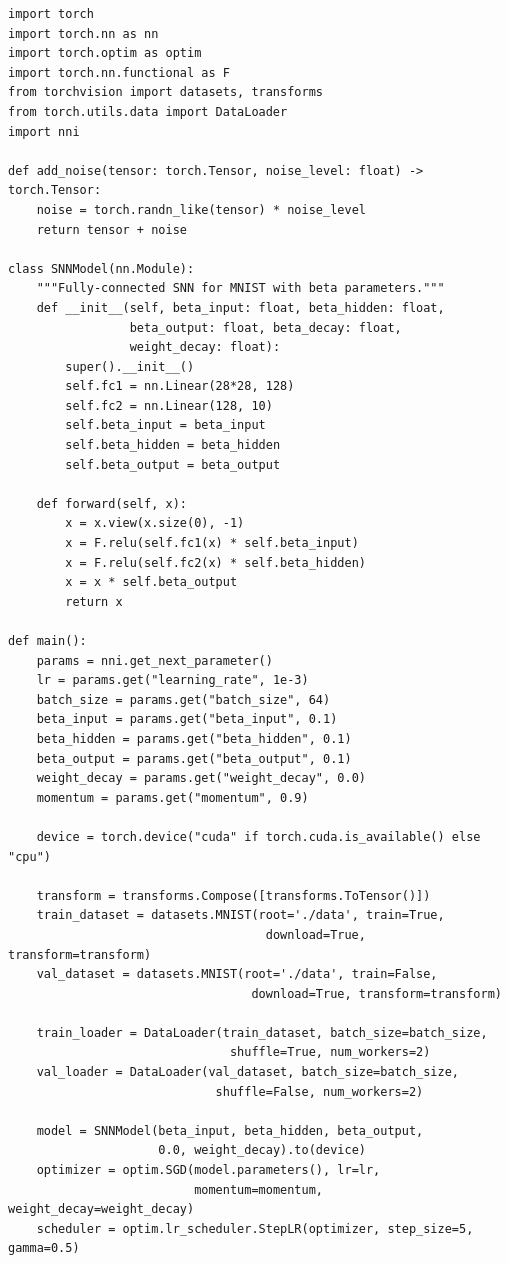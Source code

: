 \begin{lstlisting}
import torch
import torch.nn as nn
import torch.optim as optim
import torch.nn.functional as F
from torchvision import datasets, transforms
from torch.utils.data import DataLoader
import nni

def add_noise(tensor: torch.Tensor, noise_level: float) -> torch.Tensor:
    noise = torch.randn_like(tensor) * noise_level
    return tensor + noise

class SNNModel(nn.Module):
    """Fully-connected SNN for MNIST with beta parameters."""
    def __init__(self, beta_input: float, beta_hidden: float,
                 beta_output: float, beta_decay: float,
                 weight_decay: float):
        super().__init__()
        self.fc1 = nn.Linear(28*28, 128)
        self.fc2 = nn.Linear(128, 10)
        self.beta_input = beta_input
        self.beta_hidden = beta_hidden
        self.beta_output = beta_output

    def forward(self, x):
        x = x.view(x.size(0), -1)
        x = F.relu(self.fc1(x) * self.beta_input)
        x = F.relu(self.fc2(x) * self.beta_hidden)
        x = x * self.beta_output
        return x

def main():
    params = nni.get_next_parameter()
    lr = params.get("learning_rate", 1e-3)
    batch_size = params.get("batch_size", 64)
    beta_input = params.get("beta_input", 0.1)
    beta_hidden = params.get("beta_hidden", 0.1)
    beta_output = params.get("beta_output", 0.1)
    weight_decay = params.get("weight_decay", 0.0)
    momentum = params.get("momentum", 0.9)

    device = torch.device("cuda" if torch.cuda.is_available() else "cpu")
    
    transform = transforms.Compose([transforms.ToTensor()])
    train_dataset = datasets.MNIST(root='./data', train=True, 
                                    download=True, transform=transform)
    val_dataset = datasets.MNIST(root='./data', train=False, 
                                  download=True, transform=transform)

    train_loader = DataLoader(train_dataset, batch_size=batch_size, 
                               shuffle=True, num_workers=2)
    val_loader = DataLoader(val_dataset, batch_size=batch_size, 
                             shuffle=False, num_workers=2)

    model = SNNModel(beta_input, beta_hidden, beta_output, 
                     0.0, weight_decay).to(device)
    optimizer = optim.SGD(model.parameters(), lr=lr, 
                          momentum=momentum, weight_decay=weight_decay)
    scheduler = optim.lr_scheduler.StepLR(optimizer, step_size=5, gamma=0.5)


\end{lstlisting}
